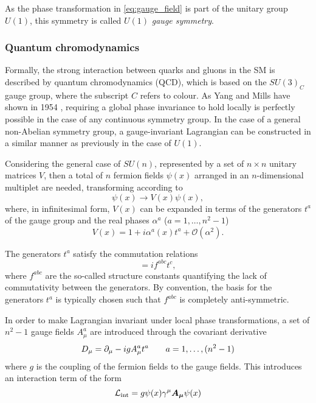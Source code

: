 As the phase transformation in \cref{eq:gauge_field} is part of the unitary group $U(1)$, this symmetry is called $U(1)$ \textit{gauge symmetry}. 

\subsubsection{Quantum chromodynamics}

Formally, the strong interaction between quarks and gluons in the SM is described by quantum chromodynamics (QCD), which is based on the $SU(3)_C$ gauge group, where the subscript $C$ refers to colour. As Yang and Mills have shown in 1954 \cite{PhysRev.96.191}, requiring a global phase invariance to hold locally is perfectly possible in the case of any continuous symmetry group. In the case of a general non-Abelian symmetry group, a gauge-invariant Lagrangian can be constructed in a similar manner as previously in the case of $U(1)$.

Considering the general case of $SU(n)$, represented by a set of $n\times n$ unitary matrices $V$, then a total of $n$ fermion fields $\psi(x)$ arranged in an $n$-dimensional multiplet are needed, transforming according to
\begin{equation}
	\psi(x) \rightarrow V(x) \psi(x),
\end{equation}
where, in infinitesimal form, $V(x)$ can be expanded in terms of the generators $t^a$ of the gauge group and the real phases $\alpha^a$ ($a = 1,\dots,n^2-1$)
\begin{equation}
	V(x) = 1 + i\alpha^a(x)t^a + \mathcal{O}(\alpha^2).
\end{equation}
 
The generators $t^a$ satisfy the commutation relations
\begin{equation}
	[t^a, t^b] = i f^{abc}t^c,
\end{equation}
where $f^{abc}$ are the so-called structure constants quantifying the lack of commutativity between the generators. By convention, the basis for the generators $t^a$ is typically chosen such that $f^{abc}$ is completely anti-symmetric.
 
In order to make Lagrangian invariant under local phase transformations, a set of $n^2-1$ gauge fields $A_\mu^a$ are introduced through the covariant derivative  
\begin{equation}
	\mathop{}\!D_\mu = \partial_\mu - igA_\mu^a t^a \qquad a = 1,\dots,(n^2-1)
\end{equation}
where $g$ is the coupling of the fermion fields to the gauge fields. This introduces an interaction term of the form
\begin{equation}
	\mathcal{L}_\mathrm{int} = g\psi(x)\gamma^\mu\boldsymbol{A_\mu}\psi(x)
\end{equation}

